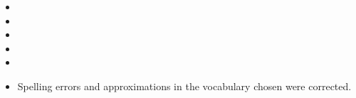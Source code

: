 \documentclass[11pt,a4paper,sans]{moderncv}        %
\begin{document}
\begin{itemize}
	\item 
	
	\item 
	
	\item 
	
	\item 
	
	\item 
	
	\item Spelling errors and approximations in the vocabulary chosen were corrected.
\end{itemize}







\justify




\makeletterclosing
\end{document}
